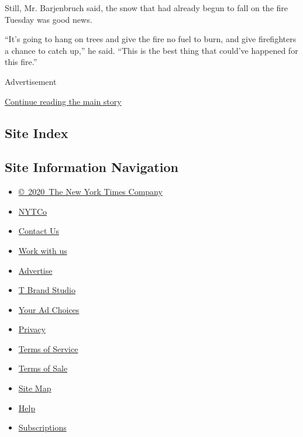 Still, Mr. Barjenbruch said, the snow that had already begun to fall on
the fire Tuesday was good news.

``It's going to hang on trees and give the fire no fuel to burn, and
give firefighters a chance to catch up,'' he said. ``This is the best
thing that could've happened for this fire.''

Advertisement

\protect\hyperlink{after-bottom}{Continue reading the main story}

\hypertarget{site-index}{%
\subsection{Site Index}\label{site-index}}

\hypertarget{site-information-navigation}{%
\subsection{Site Information
Navigation}\label{site-information-navigation}}

\begin{itemize}
\tightlist
\item
  \href{https://help.nytimes3xbfgragh.onion/hc/en-us/articles/115014792127-Copyright-notice}{©~2020~The
  New York Times Company}
\end{itemize}

\begin{itemize}
\tightlist
\item
  \href{https://www.nytco.com/}{NYTCo}
\item
  \href{https://help.nytimes3xbfgragh.onion/hc/en-us/articles/115015385887-Contact-Us}{Contact
  Us}
\item
  \href{https://www.nytco.com/careers/}{Work with us}
\item
  \href{https://nytmediakit.com/}{Advertise}
\item
  \href{http://www.tbrandstudio.com/}{T Brand Studio}
\item
  \href{https://www.nytimes3xbfgragh.onion/privacy/cookie-policy\#how-do-i-manage-trackers}{Your
  Ad Choices}
\item
  \href{https://www.nytimes3xbfgragh.onion/privacy}{Privacy}
\item
  \href{https://help.nytimes3xbfgragh.onion/hc/en-us/articles/115014893428-Terms-of-service}{Terms
  of Service}
\item
  \href{https://help.nytimes3xbfgragh.onion/hc/en-us/articles/115014893968-Terms-of-sale}{Terms
  of Sale}
\item
  \href{https://spiderbites.nytimes3xbfgragh.onion}{Site Map}
\item
  \href{https://help.nytimes3xbfgragh.onion/hc/en-us}{Help}
\item
  \href{https://www.nytimes3xbfgragh.onion/subscription?campaignId=37WXW}{Subscriptions}
\end{itemize}
